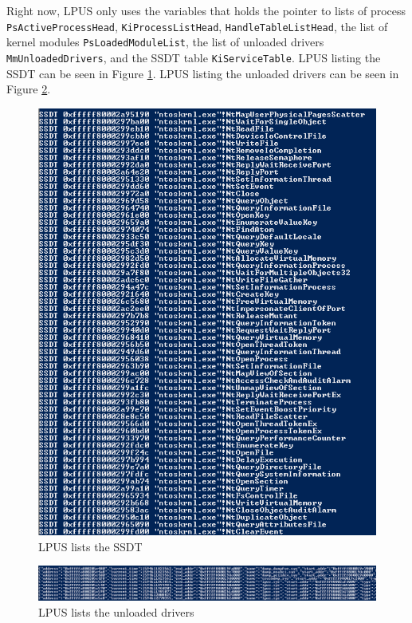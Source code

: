 Right now, LPUS only uses the variables that holds the pointer to lists of
process \texttt{PsActiveProcessHead}, \texttt{KiProcessListHead},
\texttt{HandleTableListHead}, the list of kernel modules
\texttt{PsLoadedModuleList}, the list of unloaded drivers
\texttt{MmUnloadedDrivers}, and the SSDT table \texttt{KiServiceTable}.  LPUS
listing the SSDT can be seen in Figure \ref{fig:ssdt_lpus}. LPUS listing the
unloaded drivers can be seen in Figure \ref{fig:unloaded_lpus}.

\begin{figure}[h]
  \centering
  \caption{LPUS lists the SSDT}
  \label{fig:ssdt_lpus}
  \includegraphics[scale=1]{images/ssdt_lpus.png}
\end{figure}

\begin{figure}[h]
  \centering
  \caption{LPUS lists the unloaded drivers}
  \label{fig:unloaded_lpus}
  \includegraphics[scale=0.6]{images/unloaded_lpus.png}
\end{figure}


